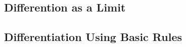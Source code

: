 \documentclass[../Math_Notes.tex]{subfiles}
\begin{document}
\subsection{Differention as a Limit}
\subsection{Differentiation Using Basic Rules}
\end{document}
